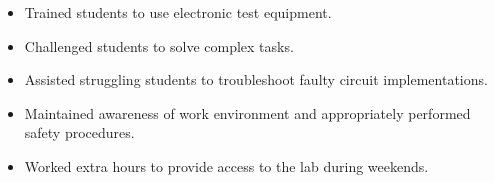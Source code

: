 \accomplishments
\begin{itemize}[leftmargin=*]
\item Trained students to use electronic test equipment. 
\item Challenged students to solve complex tasks. 
\item Assisted struggling students to troubleshoot faulty circuit implementations. 
\item Maintained awareness of work environment and appropriately performed safety procedures.
\item Worked extra hours to provide access to the lab during weekends. 
\end{itemize}